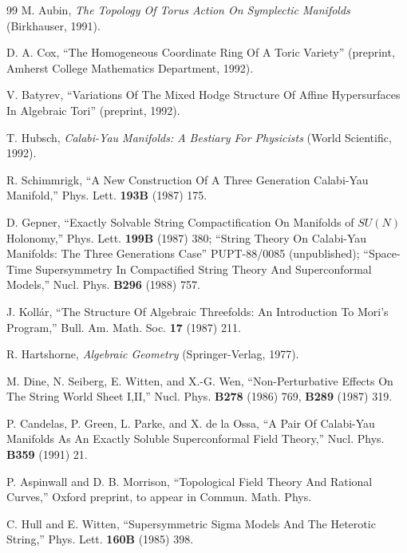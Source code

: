 \begin{thebibliography}{99}
 M. Aubin, \textit{The Topology Of Torus Action On Symplectic Manifolds} (Birkhauser, 1991).

 D. A. Cox, ``The Homogeneous Coordinate Ring Of A Toric Variety'' (preprint, Amherst College Mathematics Department, 1992).

 V. Batyrev, ``Variations Of The Mixed Hodge Structure Of Affine Hypersurfaces In Algebraic Tori'' (preprint, 1992).

 T. Hubsch, \textit{Calabi-Yau Manifolds: A Bestiary For Physicists} (World Scientific, 1992).

\label{op:91}
 R. Schimmrigk, ``A New Construction Of A Three Generation Calabi-Yau Manifold,'' Phys. Lett. \textbf{193B} (1987) 175.

 D. Gepner, ``Exactly Solvable String Compactification On Manifolds of $SU(N)$ Holonomy,'' Phys. Lett. \textbf{199B} (1987) 380; ``String Theory On Calabi-Yau Manifolds: The Three Generations Case'' PUPT-88/0085 (unpublished); ``Space-Time Supersymmetry In Compactified String Theory And Superconformal Models,'' Nucl. Phys. \textbf{B296} (1988) 757.

 J. Koll\'ar, ``The Structure Of Algebraic Threefolds: An Introduction To Mori's Program,'' Bull. Am. Math. Soc. \textbf{17} (1987) 211.

 R. Hartshorne, \textit{Algebraic Geometry} (Springer-Verlag, 1977).

 M. Dine, N. Seiberg, E. Witten, and X.-G. Wen, ``Non-Perturbative Effects On The String World Sheet I,II,'' Nucl. Phys. \textbf{B278} (1986) 769, \textbf{B289} (1987) 319.

 P. Candelas, P. Green, L. Parke, and X. de la Ossa, ``A Pair Of Calabi-Yau Manifolds As An Exactly Soluble Superconformal Field Theory,'' Nucl. Phys. \textbf{B359} (1991) 21.

 P. Aspinwall and D. B. Morrison, ``Topological Field Theory And Rational Curves,'' Oxford preprint, to appear in Commun. Math. Phys.

 C. Hull and E. Witten, ``Supersymmetric Sigma Models And The Heterotic String,'' Phys. Lett. \textbf{160B} (1985) 398.


\end{thebibliography}
